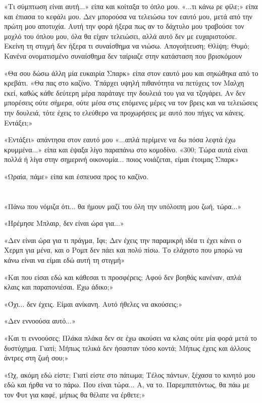\documentclass[12pt,twoside, openany]{book}
\begin{document}
«Τι σύμπτωση είναι αυτή...» είπα και κοίταξα το όπλο μου. «...τι κάνω ρε φίλε;» είπα και έπιασα το κεφάλι μου. Δεν μπορούσα να τελειώσω τον εαυτό μου, μετά από την πρώτη μου αποτυχία. Αυτή την φορά ήξερα πως αν το δάχτυλο μου τραβούσε τον μοχλό του όπλου μου, όλα θα είχαν τελειώσει, αλλά αυτό δεν με ευχαριστούσε. Εκείνη τη στιγμή δεν ήξερα τι συναίσθημα να νιώσω. Απογοήτευση; Θλίψη; Θυμό; Κανένα ονοματισμένο συναίσθημα δεν ταίριαζε στην κατάσταση που βρισκόμουν

«Θα σου δώσω άλλη μία ευκαιρία Σπαρκ» είπα στον εαυτό μου και σηκώθηκα από το κρεβάτι. «Θα πας στο καζίνο. Υπάρχει υψηλή πιθανότητα να πετύχεις τον Μαλχη εκεί, καθώς κάθε δεύτερη μέρα παράταγε την δουλειά του για να τζογάρει. Αν δεν μπορέσεις ούτε σήμερα, ούτε μέσα στις επόμενες μέρες να τον βρεις και να τελειώσεις την δουλειά, τότε έχεις το ελεύθερο να προχωρήσεις με αυτό που πήγες να κάνεις. Εντάξει;»

«Εντάξει» απάντησα στον εαυτό μου «...απλά περίμενε να δω πόσα λεφτά έχω κρυμμένα...» είπα και έψαξα λίγο παραπάνω στο κομοδίνο. «300; Τώρα αυτά είναι πολλά ή λίγα στην σημερινή οικονομία... ποιος νοιάζεται, είμαι έτοιμας Σπαρκ»

«Ωραία, πάμε» είπα και έσπευσα προς το καζίνο.

\chapter{}

«Πάνω που νόμιζα ότι... θα ήμουν μαζί του όλη την υπόλοιπη μου ζωή, τώρα...»

«Ηρέμησε Μπλαιρ, δεν είναι ώρα για...»

«Δεν είναι ώρα για τι πράγμα, Ιφι; Δεν έχεις την παραμικρή ιδέα τι έχει κάνει ο Χερμπ για μένα, και ο Ρομπ δεν πάει και πολύ πίσω. Το ελάχιστο που μπορώ να κάνω είναι να είμαι εδώ αυτή τη στιγμή»

«Και που είσαι εδώ και κάθεσαι τι προσφέρεις; Αφού δεν βοηθάς κανέναν, απλά κλαις και παραπονιέσαι. Έχω άδικο;»

«Όχι... δεν έχεις. Είμαι ανίκανη. Αυτό ήθελες να ακούσεις;»

«Δεν εννοούσα αυτό...»

«Και τι εννοούσες; Πλάκα πλάκα δεν σε έχω ακούσει να κλαις ούτε μία φορά μετά το δυστύχημα. Γιατί; Μήπως τελικά δεν ήσασταν τόσο κοντά; Μήπως έχεις και άλλους άντρες στη ζωή σου;»

«Ωχ, ακόμη εδώ είστε; Γιατί είστε στο πάτωμα; Τέλος πάντων, ξέχασα το κινητό μου εδώ και ήρθα να το πάρω. Που είναι τώρα... Α, να το. Παρεμπιπτόντως, θα πάω με τον Φυτ για καφέ, μήπως θα θέλατε να έρθετε;»
\end{document}
